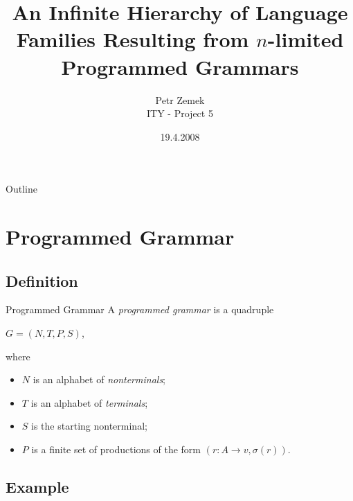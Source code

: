 \documentclass{beamer}
\title[An Infinite Hierarchy of Language Families \hspace*{7em} \insertframenumber/
\inserttotalframenumber]{An Infinite Hierarchy of Language Families Resulting from $n$-limited Programmed Grammars}
\author[Petr Zemek]
{
	Petr Zemek \\
	$ $ \\ %
	ITY - Project 5
}
\institute[Brno University of Technology]
{
	Brno University of Technology \\
	Faculty of Information Technology
}
\date{19.4.2008}
\begin{document}
\begin{frame}
	\titlepage
\end{frame}

\begin{frame}{Outline}
	\tableofcontents
\end{frame}

\section{Programmed Grammar}

\subsection{Definition}

\begin{frame}{Programmed Grammar}
	A \emph{programmed grammar} is a quadruple
	\begin{center}
		$G = (N, T, P, S)$,
	\end{center}
	where
	\begin{itemize}
		\item $N$ is an alphabet of \emph{nonterminals};
		\item $T$ is an alphabet of \emph{terminals};
		\item $S$ is the starting nonterminal;
		\item $P$ is a finite set of productions of the form $(r: A \rightarrow v, \sigma(r))$.
	\end{itemize}
\end{frame}

\subsection{Example}
\end{document}
